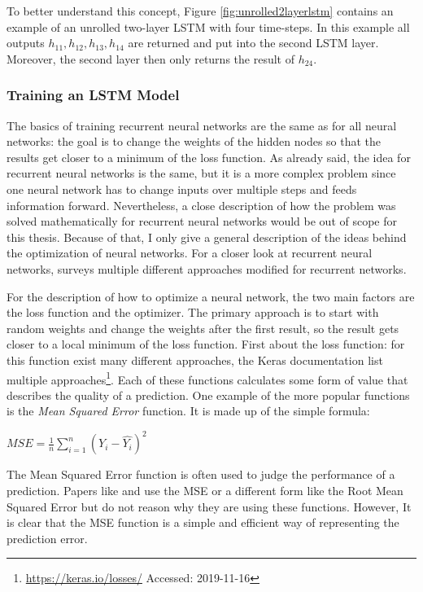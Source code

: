 To better understand this concept, Figure \ref{fig:unrolled2layerlstm} contains an example of an unrolled two-layer LSTM with four time-steps.
In this example all outputs $h_{11}, h_{12}, h_{13}, h_{14}$ are returned and put into the second LSTM layer.
Moreover, the second layer then only returns the result of $h_{24}$.


\subsubsection{Training an LSTM Model}  \label{training}
The basics of training recurrent neural networks are the same as for all neural networks: the goal is to change the weights of the hidden nodes so that the results get closer to a minimum of the loss function.
As already said, the idea for recurrent neural networks is the same, but it is a more complex problem since one neural network has to change inputs over multiple steps and feeds information forward.
Nevertheless, a close description of how the problem was solved mathematically for recurrent neural networks would be out of scope for this thesis. Because of that, I only give a general description of the ideas behind the optimization of neural networks.
For a closer look at recurrent neural networks, \cite{GradientRecurrent} surveys multiple different approaches modified for recurrent networks.

For the description of how to optimize a neural network, the two main factors are the loss function and the optimizer.
The primary approach is to start with random weights and change the weights after the first result, so the result gets closer to a local minimum of the loss function.
First about the loss function: for this function exist many different approaches, the Keras documentation list multiple approaches\footnote{\url{https://keras.io/losses/} Accessed: 2019-11-16}.
Each of these functions calculates some form of value that describes the quality of a prediction.
One example of the more popular functions is the \textit{Mean Squared Error} function.
It is made up of the simple formula:
\begin{displayquote}
	$MSE=\frac{1}{n}\sum _{i=1}^{n}{\left({Y}_{i}-\hat{{Y}_i}\right)}^{2}$
\end{displayquote}
The Mean Squared Error function is often used to judge the performance of a prediction.
Papers like \cite{deepLearningApproaches} and \cite{8292737} use the MSE or a different form like the Root Mean Squared Error but do not reason why they are using these functions.
However, It is clear that the MSE function is a simple and efficient way of representing the prediction error.

